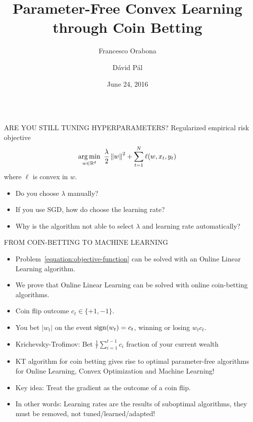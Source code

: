 \documentclass[final,t,serif,mathserif]{beamer}
\title{\huge Parameter-Free Convex Learning through Coin Betting}
\author{Francesco Orabona \and D\'avid P\'al}
\institute[] %
{
  Yahoo Research, New York
}
\date[June 24, 2016]{June 24, 2016}
\begin{document}
\begin{frame}{}

\begin{columns}[t]

\begin{column}{.33\linewidth}

    \begin{block}{ARE YOU STILL TUNING HYPERPARAMETERS?}
      Regularized empirical risk objective
      \begin{equation}
      \label{equation:objective-function}
         \operatorname*{arg\,min}_{w \in \mathbb{R}^d} \ \frac{\lambda}{2} \left\|{w}\right\|^2 + \sum_{t=1}^N \ell(w, x_t, y_t)
      \end{equation}
      where $\ell$ is convex in $w$.
      \begin{itemize}
      \item Do you choose $\lambda$ manually?
      \item If you use SGD, how do choose the learning rate?
      \item Why is the algorithm not able to select $\lambda$ and learning rate automatically?
      \end{itemize}
    \end{block}

    \begin{block}{FROM COIN-BETTING TO MACHINE LEARNING}
    \begin{itemize}
      \item Problem~\eqref{equation:objective-function} can be solved with an Online Linear Learning algorithm.
      \item We prove that Online Linear Learning can be solved with online coin-betting algorithms.
    \end{itemize}

    \vspace{1cm}

    \begin{itemize}
      \item Coin flip outcome $c_t \in \{+1, -1\}$.
      \item You bet $|w_t|$ on the event ${\rm sign}(w_t) = c_t$, winning or losing $w_t c_t$.
      \item Krichevsky-Trofimov: Bet $\tfrac{1}{t} \sum_{i=1}^{t-1} c_i$ fraction of your current wealth
      \item \alert{KT algorithm for coin betting gives rise to optimal parameter-free algorithms for Online Learning, Convex Optimization and Machine Learning!}
      \item Key idea: Treat the gradient as the outcome of a coin flip.
      \item In other words: \alert{Learning rates are the results of suboptimal algorithms, they must be removed, not tuned/learned/adapted!}
    \end{itemize}
    \end{block}


\end{column}
\end{columns}
\end{frame}
\end{document}
